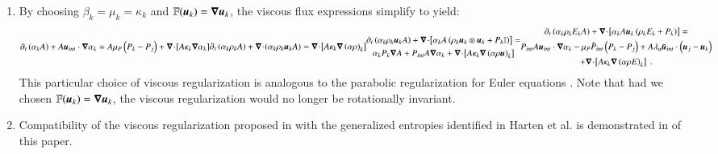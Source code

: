 \begin{enumerate}
\item { By choosing $\beta_k = \mu_k = \kappa_k$ and $\mathbb{F}(\boldsymbol u_k) = \boldsymbol\nabla \boldsymbol u_k$, the viscous flux expressions simplify to yield: 
\begin{subequations}\label{eq:sev_equ-parab}
\begin{align}\label{eq:sev_equ-parab-vf}
\partial_t \left( \alpha_k  A\right) + A \mbold u_{int} \cdot \grad \alpha_k = A \mu_P \left( P_k - P_j \right) + \div \left[ A \kappa_k \grad \alpha_k \right]
\end{align}
\begin{align}\label{eq:sev_equ-parab-cont}
\partial_t \left( \alpha_k \rho_k A \right) + \div \left( \alpha_k \rho_k \mbold u_k A \right) = \div \left[ A \kappa_k \grad \left( \alpha \rho \right)_k \right]
\end{align}
\begin{multline}\label{eq:sev_equ-parab-mom}
\partial_t \left( \alpha_k \rho_k \mbold u_k A \right) + \div \left[ \alpha_k A \left( \rho_k \mbold u_k \otimes \mbold u_k + P_k \mathbb{I} \right) \right] = \\
\alpha_k P_k \grad A + P_{int} A \grad \alpha_k + \div \left[ A \kappa_k \grad \left( \alpha \rho \mbold u  \right)_k \right] 
\end{multline}
\begin{multline}\label{eq:sev_equ-parab-ener}
\partial_t \left( \alpha_k \rho_k E_k A \right) + \div \left[ \alpha_k A \mbold u_k \left( \rho_k E_k + P_k \right) \right] = \\
P_{int} A \mbold u_{int} \cdot \grad \alpha_k -
\mu_P \bar{P}_{int} \left( P_k-P_j \right) + 
A \lambda_u \bar{\mbold u}_{int} \cdot \left( \mbold u_j - \mbold u_k \right)  \\
+ \div \left[A \kappa_k \grad \left( \alpha \rho E \right)_k \right] \ .
\end{multline} 
\end{subequations}
This particular choice of viscous regularization is analogous to the parabolic regularization for Euler equations \cite{Parabolic}. 
Note that had we chosen $\mathbb{F}(\boldsymbol u_k) = \boldsymbol\nabla \boldsymbol u_k$, the viscous regularization would no longer be rotationally invariant.
}
    
\item{Compatibility of the viscous regularization proposed in  with the generalized entropies identified 
in Harten et al. \cite{Harten} is demonstrated in  of this paper. } 
\end{enumerate}
